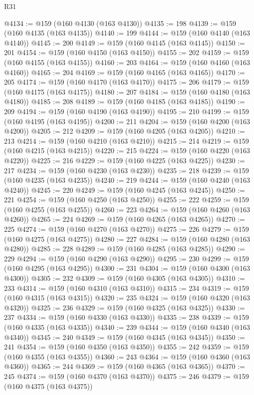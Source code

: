 \begin{lexlean}{R31}
\begin{coremodule}
@4134 := @159 (@160 @4130 (@163 @4130))
@4135 := 198
@4139 := @159 (@160 @4135 (@163 @4135))
@4140 := 199
@4144 := @159 (@160 @4140 (@163 @4140))
@4145 := 200
@4149 := @159 (@160 @4145 (@163 @4145))
@4150 := 201
@4154 := @159 (@160 @4150 (@163 @4150))
@4155 := 202
@4159 := @159 (@160 @4155 (@163 @4155))
@4160 := 203
@4164 := @159 (@160 @4160 (@163 @4160))
@4165 := 204
@4169 := @159 (@160 @4165 (@163 @4165))
@4170 := 205
@4174 := @159 (@160 @4170 (@163 @4170))
@4175 := 206
@4179 := @159 (@160 @4175 (@163 @4175))
@4180 := 207
@4184 := @159 (@160 @4180 (@163 @4180))
@4185 := 208
@4189 := @159 (@160 @4185 (@163 @4185))
@4190 := 209
@4194 := @159 (@160 @4190 (@163 @4190))
@4195 := 210
@4199 := @159 (@160 @4195 (@163 @4195))
@4200 := 211
@4204 := @159 (@160 @4200 (@163 @4200))
@4205 := 212
@4209 := @159 (@160 @4205 (@163 @4205))
@4210 := 213
@4214 := @159 (@160 @4210 (@163 @4210))
@4215 := 214
@4219 := @159 (@160 @4215 (@163 @4215))
@4220 := 215
@4224 := @159 (@160 @4220 (@163 @4220))
@4225 := 216
@4229 := @159 (@160 @4225 (@163 @4225))
@4230 := 217
@4234 := @159 (@160 @4230 (@163 @4230))
@4235 := 218
@4239 := @159 (@160 @4235 (@163 @4235))
@4240 := 219
@4244 := @159 (@160 @4240 (@163 @4240))
@4245 := 220
@4249 := @159 (@160 @4245 (@163 @4245))
@4250 := 221
@4254 := @159 (@160 @4250 (@163 @4250))
@4255 := 222
@4259 := @159 (@160 @4255 (@163 @4255))
@4260 := 223
@4264 := @159 (@160 @4260 (@163 @4260))
@4265 := 224
@4269 := @159 (@160 @4265 (@163 @4265))
@4270 := 225
@4274 := @159 (@160 @4270 (@163 @4270))
@4275 := 226
@4279 := @159 (@160 @4275 (@163 @4275))
@4280 := 227
@4284 := @159 (@160 @4280 (@163 @4280))
@4285 := 228
@4289 := @159 (@160 @4285 (@163 @4285))
@4290 := 229
@4294 := @159 (@160 @4290 (@163 @4290))
@4295 := 230
@4299 := @159 (@160 @4295 (@163 @4295))
@4300 := 231
@4304 := @159 (@160 @4300 (@163 @4300))
@4305 := 232
@4309 := @159 (@160 @4305 (@163 @4305))
@4310 := 233
@4314 := @159 (@160 @4310 (@163 @4310))
@4315 := 234
@4319 := @159 (@160 @4315 (@163 @4315))
@4320 := 235
@4324 := @159 (@160 @4320 (@163 @4320))
@4325 := 236
@4329 := @159 (@160 @4325 (@163 @4325))
@4330 := 237
@4334 := @159 (@160 @4330 (@163 @4330))
@4335 := 238
@4339 := @159 (@160 @4335 (@163 @4335))
@4340 := 239
@4344 := @159 (@160 @4340 (@163 @4340))
@4345 := 240
@4349 := @159 (@160 @4345 (@163 @4345))
@4350 := 241
@4354 := @159 (@160 @4350 (@163 @4350))
@4355 := 242
@4359 := @159 (@160 @4355 (@163 @4355))
@4360 := 243
@4364 := @159 (@160 @4360 (@163 @4360))
@4365 := 244
@4369 := @159 (@160 @4365 (@163 @4365))
@4370 := 245
@4374 := @159 (@160 @4370 (@163 @4370))
@4375 := 246
@4379 := @159 (@160 @4375 (@163 @4375))

\end{coremodule}
\end{lexlean}
